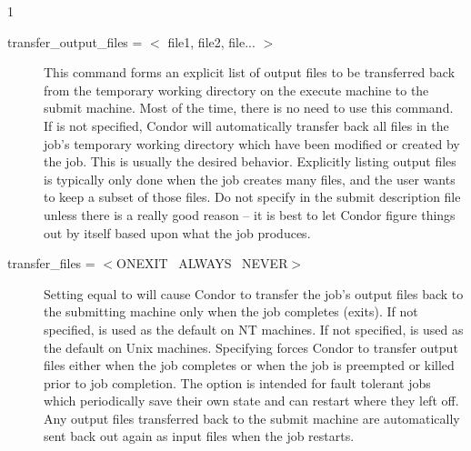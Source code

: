 \begin{ManPage}{\label{man-condor-submit}}{1}
\begin{description}
\item[transfer\_output\_files = $<$ file1, file2, file... $>$] This
command forms an explicit list of output files to be transferred
back from the
temporary working directory on the execute machine to the submit machine.
Most of the time, there is no need to use this command.
If  is not specified,
Condor will automatically transfer back all files in the job's
temporary working directory which have been
modified or created by the job.
This is usually the desired behavior.
Explicitly listing output files is typically only done when the job creates
many files, and the user wants to keep a subset of
those files. 
\Warn Do not specify  in the
submit description file unless there is a really good reason -- it is
best to let Condor figure things out by itself based upon what
the job produces.


\item[transfer\_files = $<$ONEXIT \Bar\ ALWAYS \Bar\ NEVER$>$] Setting
 equal to  will cause Condor to transfer the
job's output files back to the submitting machine only when the job
completes (exits).
If not specified,  is used as the default on NT machines.
If not specified,  is used as the default on Unix machines.
Specifying  forces Condor to transfer output files either when
the job completes or when the job is preempted or killed
prior to job completion.
The  option is intended
for fault tolerant jobs which periodically save their own state and
can restart where they left off.  Any output files transferred back to the
submit machine are automatically sent back
out again as input files when the job restarts.




\end{description}
\end{ManPage}
